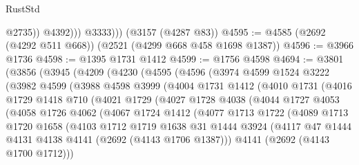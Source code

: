 \begin{lexlean}{RustStd}
\begin{coremodule}
{\begin{coremodule}
{{{{{{{{{{                    @2735))
                @4392)))
          @3333)))
    (@3157 (@4287 @83))
@4595 := @4585 (@2692 (@4292 @511 @668)) (@2521 (@4299 @668 @458 @1698 @1387))
@4596 := @3966 @1736
@4598 := @1395 @1731 @1412
@4599 := @1756 @4598
@4694 := @3801
    (@3856
      (@3945
        (@4209
          (@4230
            (@4595
              (@4596
                (@3974
                  @4599
                  @1524
                  @3222
                  (@3982
                    @4599
                    (@3988
                      @4598
                      @3999
                      (@4004
                        @1731
                        @1412
                        (@4010
                          @1731
                          (@4016
                            @1729
                            @1418
                            @710
                            (@4021
                              @1729
                              (@4027
                                @1728
                                @4038
                                (@4044
                                  @1727
                                  @4053
                                  (@4058
                                    @1726
                                    @4062
                                    (@4067
                                      @1724
                                      @1412
                                      (@4077
                                        @1713
                                        @1722
                                        (@4089
                                          @1713
                                          @1720
                                          @1658
                                          (@4103
                                            @1712
                                            @1719
                                            @1638
                                            @31
                                            @1444
                                            @3924
                                            (@4117
                                              @47
                                              @1444
                                              @4131
                                              @4138
                                              @4141
                                              (@2692 (@4143 @1706 @1387)))
                                            @4141
                                            (@2692 (@4143 @1700 @1712)))
}}}}}}}}}}
\end{coremodule}}
\end{coremodule}
\end{lexlean}
